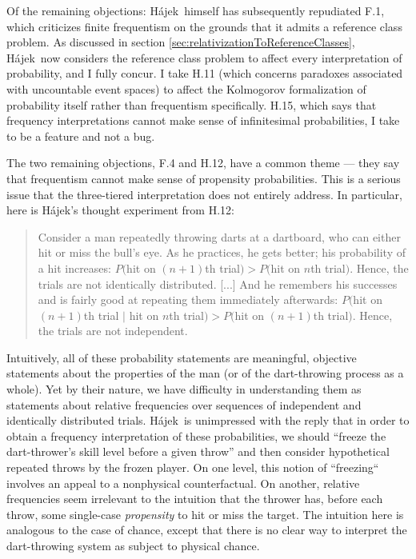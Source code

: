 \documentclass[letterpaper,12pt]{article}
\newcommand{\hajek}{H\'ajek}
\begin{document}
Of the remaining objections: \hajek\ himself has subsequently repudiated F.1, which criticizes finite frequentism on the grounds that it admits a reference class problem. As discussed in section \ref{sec:relativizationToReferenceClasses}, \hajek\ now considers the reference class problem to affect every interpretation of probability, and I fully concur. I take H.11 (which concerns paradoxes associated with uncountable event spaces) to affect the Kolmogorov formalization of probability itself rather than frequentism specifically. H.15, which says that frequency interpretations cannot make sense of infinitesimal probabilities, I take to be a feature and not a bug.

The two remaining objections, F.4 and H.12, have a common theme --- they say that frequentism cannot make sense of propensity probabilities. This is a serious issue that the three-tiered interpretation does not entirely address. In particular, here is \hajek's thought experiment from H.12:
\begin{quotation}
Consider a man repeatedly throwing darts at a dartboard, who can either hit or miss the bull's eye. As he practices, he gets better; his probability of a hit increases: $P($hit on $(n+1)$th trial$) > P($hit on $n$th trial$)$. Hence, the trials are not identically distributed. [...] And he remembers his successes and is fairly good at repeating them immediately afterwards: $P($hit on $(n+1)$th trial $\mid$ hit on $n$th trial$) > P($hit on $(n+1)$th trial$)$. Hence, the trials are not independent.
\end{quotation}
Intuitively, all of these probability statements are meaningful, objective statements about the properties of the man (or of the dart-throwing process as a whole). Yet by their nature, we have difficulty in understanding them as statements about relative frequencies over sequences of independent and identically distributed trials. \hajek\ is unimpressed with the reply that in order to obtain a frequency interpretation of these probabilities, we should ``freeze the dart-thrower's skill level before a given throw'' and then consider hypothetical repeated throws by the frozen player. On one level, this notion of ``freezing`` involves an appeal to a nonphysical counterfactual. On another, relative frequencies seem irrelevant to the intuition that the thrower has, before each throw, some single-case \emph{propensity} to hit or miss the target. The intuition here is analogous to the case of chance, except that there is no clear way to interpret the dart-throwing system as subject to physical chance.
\end{document}
